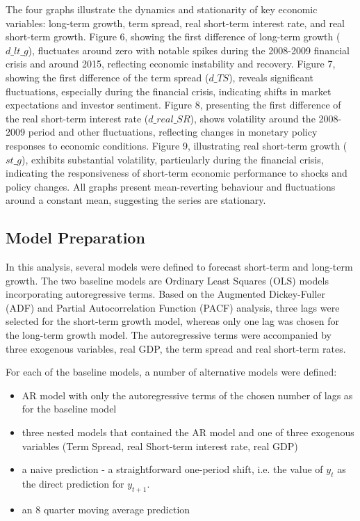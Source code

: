 \documentclass[12pt]{article}
\begin{document}
The four graphs illustrate the dynamics and stationarity of key economic variables: long-term growth, term spread, real short-term interest rate, and real short-term growth. Figure 6, showing the first difference of long-term growth (\(d\_lt\_g\)), fluctuates around zero with notable spikes during the 2008-2009 financial crisis and around 2015, reflecting economic instability and recovery. Figure 7, showing the first difference of the term spread (\(d\_TS\)), reveals significant fluctuations, especially during the financial crisis, indicating shifts in market expectations and investor sentiment. Figure 8, presenting the first difference of the real short-term interest rate (\(d\_real\_SR\)), shows volatility around the 2008-2009 period and other fluctuations, reflecting changes in monetary policy responses to economic conditions. Figure 9, illustrating real short-term growth (\(st\_g\)), exhibits substantial volatility, particularly during the financial crisis, indicating the responsiveness of short-term economic performance to shocks and policy changes. All graphs present mean-reverting behaviour and fluctuations around a constant mean, suggesting the series are stationary.

\subsection{Model Preparation}

In this analysis, several models were defined to forecast short-term and long-term growth. The two baseline models are Ordinary Least Squares (OLS) models incorporating autoregressive terms. Based on the Augmented Dickey-Fuller (ADF) and Partial Autocorrelation Function (PACF) analysis, three lags were selected for the short-term growth model, whereas only one lag was chosen for the long-term growth model. The autoregressive terms were accompanied by three exogenous variables, real GDP, the term spread and real short-term rates.

For each of the baseline models, a number of alternative models were defined:

\begin{itemize}
    \item AR model with only the autoregressive terms of the chosen number of lags as for the baseline model
    \item three nested models that contained the AR model and one of three exogenous variables (Term Spread, real Short-term interest rate, real GDP)
    \item a naive prediction - a straightforward one-period shift, i.e. the value of $y_t$  as the direct prediction for $y_{t+1}$.
    \item an 8 quarter moving average prediction
\end{itemize}
\end{document}
